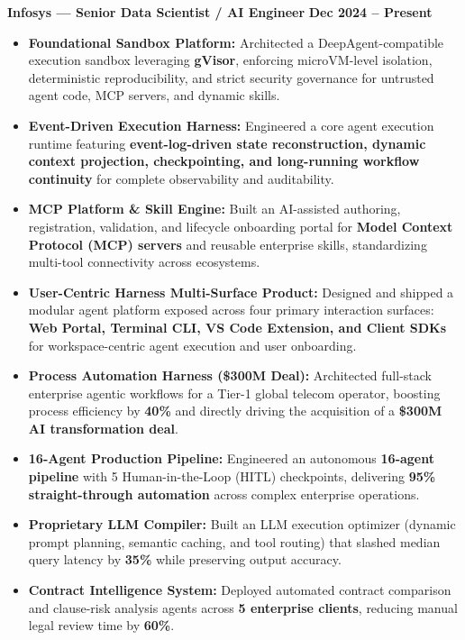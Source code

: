 \documentclass[10pt,a4paper]{article}
\begin{document}
\textbf{Infosys --- Senior Data Scientist / AI Engineer} \hfill \textbf{Dec 2024 -- Present}
\begin{itemize}
    \item \textbf{Foundational Sandbox Platform:} Architected a DeepAgent-compatible execution sandbox leveraging \textbf{gVisor}, enforcing microVM-level isolation, deterministic reproducibility, and strict security governance for untrusted agent code, MCP servers, and dynamic skills.
    \item \textbf{Event-Driven Execution Harness:} Engineered a core agent execution runtime featuring \textbf{event-log-driven state reconstruction, dynamic context projection, checkpointing, and long-running workflow continuity} for complete observability and auditability.
    \item \textbf{MCP Platform \& Skill Engine:} Built an AI-assisted authoring, registration, validation, and lifecycle onboarding portal for \textbf{Model Context Protocol (MCP) servers} and reusable enterprise skills, standardizing multi-tool connectivity across ecosystems.
    \item \textbf{User-Centric Harness Multi-Surface Product:} Designed and shipped a modular agent platform exposed across four primary interaction surfaces: \textbf{Web Portal, Terminal CLI, VS Code Extension, and Client SDKs} for workspace-centric agent execution and user onboarding.
    \item \textbf{Process Automation Harness (\$300M Deal):} Architected full-stack enterprise agentic workflows for a Tier-1 global telecom operator, boosting process efficiency by \textbf{40\%} and directly driving the acquisition of a \textbf{\$300M AI transformation deal}.
    \item \textbf{16-Agent Production Pipeline:} Engineered an autonomous \textbf{16-agent pipeline} with 5 Human-in-the-Loop (HITL) checkpoints, delivering \textbf{95\% straight-through automation} across complex enterprise operations.
    \item \textbf{Proprietary LLM Compiler:} Built an LLM execution optimizer (dynamic prompt planning, semantic caching, and tool routing) that slashed median query latency by \textbf{35\%} while preserving output accuracy.
    \item \textbf{Contract Intelligence System:} Deployed automated contract comparison and clause-risk analysis agents across \textbf{5 enterprise clients}, reducing manual legal review time by \textbf{60\%}.
\end{itemize}
\end{document}
